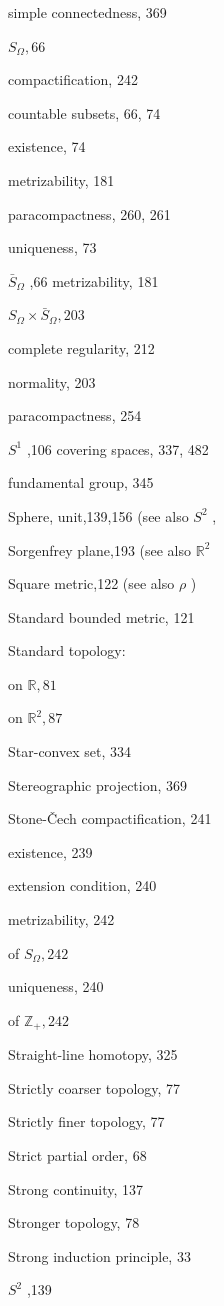 simple connectedness, 369

\({S}_{\Omega },{66}\)

compactification, 242

countable subsets, 66, 74

existence, 74

metrizability, 181

paracompactness, 260, 261

uniqueness, 73

\({\bar{S}}_{\Omega }\) ,66 metrizability, 181

\({S}_{\Omega } \times  {\bar{S}}_{\Omega },{203}\)

complete regularity, 212

normality, 203

paracompactness, 254

\({S}^{1}\) ,106 covering spaces, 337, 482

fundamental group, 345

Sphere, unit,139,156 (see also \({S}^{2}\) ,

Sorgenfrey plane,193 (see also \({\mathbb{R}}^{2}\)

Square metric,122 (see also \(\rho\) )

Standard bounded metric, 121

Standard topology:

on \(\mathbb{R},{81}\)

on \({\mathbb{R}}^{2},{87}\)

Star-convex set, 334

Stereographic projection, 369

Stone-Čech compactification, 241

existence, 239

extension condition, 240

metrizability, 242

of \({S}_{\Omega },{242}\)

uniqueness, 240

of \({\mathbb{Z}}_{ + },{242}\)

Straight-line homotopy, 325

Strictly coarser topology, 77

Strictly finer topology, 77

Strict partial order, 68

Strong continuity, 137

Stronger topology, 78

Strong induction principle, 33

\({S}^{2}\) ,139

